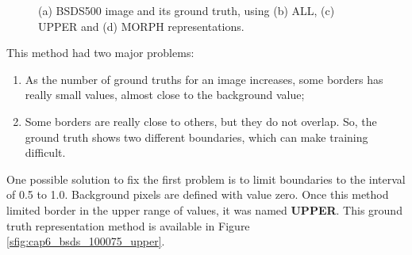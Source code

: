\begin{figure}%
  \centering
  \caption{(a) BSDS500 image and its ground truth, using (b) ALL, (c) UPPER and (d) MORPH representations.}
  \hfill
  \hfill
  \hfill
  \sourceOwn
  \label{fig:cap6_bsds_all}
\end{figure}

This method had two major problems:

\begin{enumerate}
    \item As the number of ground truths for an image increases, some borders has really small values, almost close to the background value;
    \item Some borders are really close to others, but they do not overlap. So, the ground truth shows two different boundaries, which can make training difficult.
\end{enumerate}

One possible solution to fix the first problem is to limit boundaries to the interval of 0.5 to 1.0.
Background pixels are defined with value zero.
Once this method limited border in the upper range of values, it was named \textbf{UPPER}.
This ground truth representation method is available in Figure \ref{sfig:cap6_bsds_100075_upper}.

